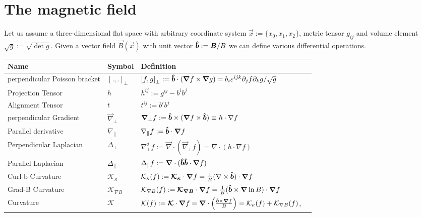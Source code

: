 \section{The magnetic field}\label{sec:magnetic}
Let us assume a three-dimensional flat space with arbitrary coordinate
system $\vec x :=\{x_0, x_1, x_2\}$, metric
tensor $g_{ij}$ and volume element $\sqrt{g} := \sqrt{\det g}$.
Given a vector field $\vec B(\vec x)$ with unit vector $\bm{\hat{b}} := {\boldsymbol{B}}/B$
we can define various differential operations.
\begin{longtable}{lll>{\RaggedRight}p{7cm}}
\rowcolor{gray!50}\textbf{Name} &  \textbf{Symbol} & \textbf{Definition} \\
\midrule
    perpendicular Poisson bracket&
    $\left[.,.\right]_\perp$ & 
    $\left[f,g\right]_\perp := \bm{\hat{b}} \cdot \left({\boldsymbol{\nabla}} f \times {\boldsymbol{\nabla}} g\right) =
    b_i \varepsilon^{ijk}\partial_j f\partial_k g/\sqrt{g}$  \\
    Projection Tensor&
    $h $ & $h^{ij} := g^{ij} - b^ib^j $\\
    Alignment Tensor&
    $t $ & $ t^{ij} := b^ib^j$\\
    perpendicular Gradient&
    $\vec \nabla_\perp $&
    $ {\boldsymbol{\nabla}}_\perp f := \bm{\hat{b}}\times({\boldsymbol{\nabla}} f\times \bm{\hat{b}} ) \equiv
    h \cdot \nabla f$ \\
    Parallel derivative&
    $\nabla_\parallel $&
    $ \nabla_\parallel f := \bm{\hat{b}}\cdot{\boldsymbol{\nabla}} f$ \\
    Perpendicular Laplacian&
    $\Delta_\perp $&
    $ \nabla_\perp^2 f:= \vec \nabla\cdot (\vec \nabla_\perp f)
    = \nabla\cdot( h\cdot\nabla f)$  \\
    Parallel Laplacian&
    $\Delta_\parallel $&
    $\Delta_\parallel f:= {\boldsymbol{\nabla}} \cdot ( \bm{\hat{b}}\bm{\hat{b}}\cdot{\boldsymbol{\nabla}} f )$\\
    Curl-b Curvature &
    $\mathcal K_\kappa$ &
    $\mathcal K_\kappa(f) := {\boldsymbol{ \mathcal K_\kappa }}\cdot {\boldsymbol{\nabla}} f = \frac{1}{B}(\nabla \times \bm{\hat{b}})\cdot {\boldsymbol{\nabla}} f$ \\
    Grad-B Curvature &
    $\mathcal K_{\nabla B} $ &
    $\mathcal K_{\nabla B}(f) := {\boldsymbol{\mathcal K_{\nabla B}}} \cdot {\boldsymbol{\nabla}} f = \frac{1}{B}(\bm{\hat{b}} \times {\boldsymbol{\nabla}} \ln B)\cdot {\boldsymbol{\nabla}} f$ \\
    Curvature &
    $\mathcal K$ &
    $\mathcal{K}(f):={\boldsymbol{\mathcal K}} \cdot {\boldsymbol{\nabla}} f = {\boldsymbol{\nabla}} \cdot \left(\frac{ \bm{\hat{b}} \times {\boldsymbol{\nabla}} f}{B} \right) = \mathcal K_\kappa(f) + \mathcal K_{\nabla B}(f)$,\\
\bottomrule
\end{longtable}
